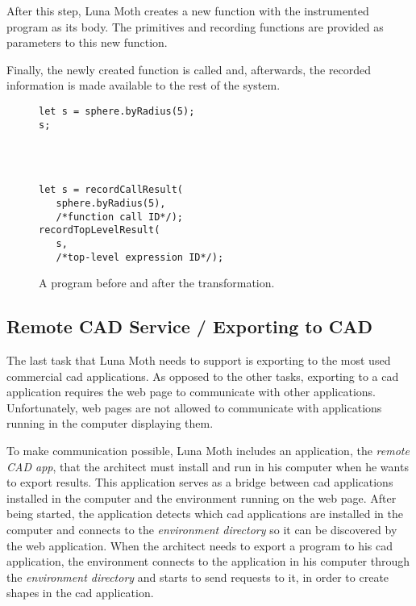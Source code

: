 After this step, Luna Moth creates a new function with the instrumented program as its body.
The primitives and recording functions are provided as parameters to this new function.

Finally, the newly created function is called and, afterwards, the recorded information is made available to the rest of the system.

\begin{figure}
  \centering
\begin{minipage}[t]{1.0\linewidth}
  \begin{verbatim}
let s = sphere.byRadius(5);
s;




  \end{verbatim}
\end{minipage}
\center{\rule{0.8\linewidth}{0.4pt}}
\begin{minipage}[t]{1.0\linewidth}
  \begin{verbatim}
let s = recordCallResult(
   sphere.byRadius(5),
   /*function call ID*/);
recordTopLevelResult(
   s,
   /*top-level expression ID*/);
  \end{verbatim}
\end{minipage}
  \caption{A program before and after the transformation.}
  \label{fig:instrument:example}
\end{figure}


\subsection{Remote CAD Service / Exporting to CAD}
The last task that Luna Moth needs to support is exporting to the most used commercial \gls{cad} applications.
As opposed to the other tasks, exporting to a \gls{cad} application requires the web page to communicate with other applications.
Unfortunately, web pages are not allowed to communicate with applications running in the computer displaying them.

To make communication possible, Luna Moth includes an application, the \textit{remote CAD app}, that the architect must install and run in his computer when he wants to export results.
This application serves as a bridge between \gls{cad} applications installed in the computer and the environment running on the web page.
After being started, the application detects which \gls{cad} applications are installed in the computer and connects to the \textit{environment directory} so it can be discovered by the web application.
When the architect needs to export a program to his \gls{cad} application, the environment connects to the application in his computer through the \textit{environment directory} and starts to send requests to it, in order to create shapes in the \gls{cad} application.

